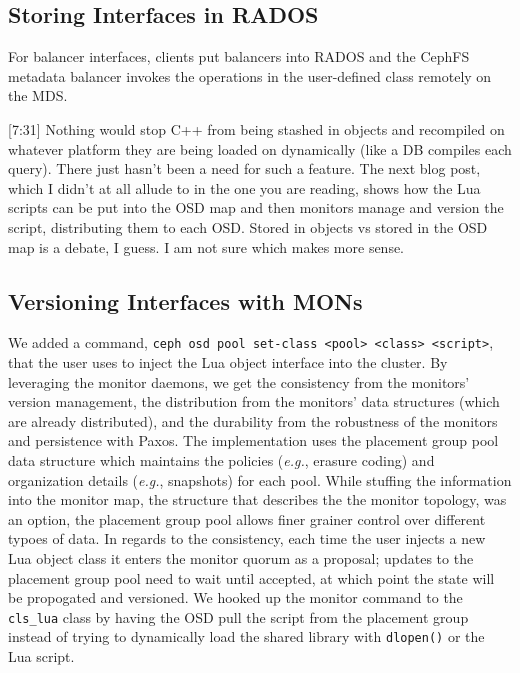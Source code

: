 \documentclass[10pt,twocolumn]{article}
\begin{document}
\subsection{Storing Interfaces in
RADOS}\label{storing-interfaces-in-rados}

For balancer interfaces, clients put balancers into RADOS and the CephFS
metadata balancer invokes the operations in the user-defined class
remotely on the MDS.

{[}7:31{]} Nothing would stop C++ from being stashed in objects and
recompiled on whatever platform they are being loaded on dynamically
(like a DB compiles each query). There just hasn't been a need for such
a feature. The next blog post, which I didn't at all allude to in the
one you are reading, shows how the Lua scripts can be put into the OSD
map and then monitors manage and version the script, distributing them
to each OSD. Stored in objects vs stored in the OSD map is a debate, I
guess. I am not sure which makes more sense.

\subsection{Versioning Interfaces with
MONs}\label{versioning-interfaces-with-mons}

We added a command,
\texttt{ceph\ osd\ pool\ set-class\ \textless{}pool\textgreater{}\ \textless{}class\textgreater{}\ \textless{}script\textgreater{}},
that the user uses to inject the Lua object interface into the cluster.
By leveraging the monitor daemons, we get the consistency from the
monitors' version management, the distribution from the monitors' data
structures (which are already distributed), and the durability from the
robustness of the monitors and persistence with Paxos. The
implementation uses the placement group pool data structure which
maintains the policies (\emph{e.g.}, erasure coding) and organization
details (\emph{e.g.}, snapshots) for each pool. While stuffing the
information into the monitor map, the structure that describes the the
monitor topology, was an option, the placement group pool allows finer
grainer control over different typoes of data. In regards to the
consistency, each time the user injects a new Lua object class it enters
the monitor quorum as a proposal; updates to the placement group pool
need to wait until accepted, at which point the state will be propogated
and versioned. We hooked up the monitor command to the \texttt{cls\_lua}
class by having the OSD pull the script from the placement group instead
of trying to dynamically load the shared library with \texttt{dlopen()}
or the Lua script.
\end{document}
